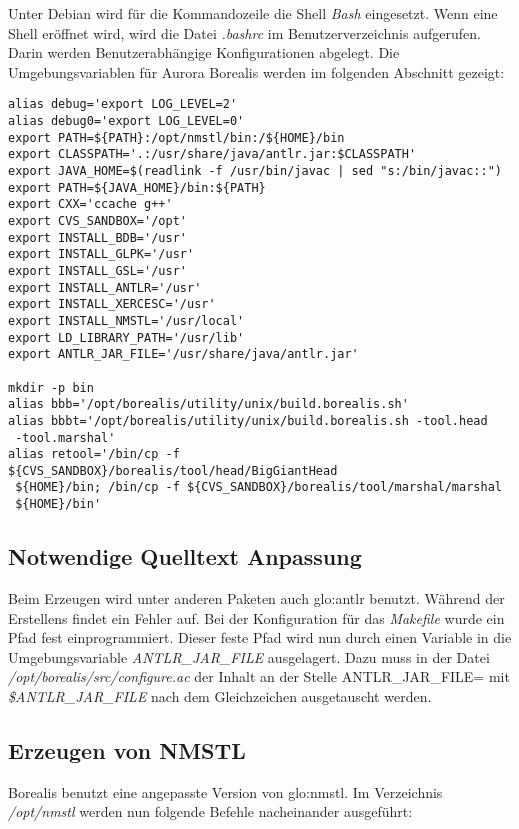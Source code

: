 Unter Debian wird für die Kommandozeile die Shell \textit{Bash} eingesetzt. Wenn eine Shell eröffnet wird, wird die Datei \textit{.bashrc} im Benutzerverzeichnis aufgerufen. Darin werden Benutzerabhängige Konfigurationen abgelegt. Die Umgebungsvariablen für Aurora Borealis werden im folgenden Abschnitt gezeigt:
\begin{verbatim}
alias debug='export LOG_LEVEL=2'
alias debug0='export LOG_LEVEL=0'
export PATH=${PATH}:/opt/nmstl/bin:/${HOME}/bin
export CLASSPATH='.:/usr/share/java/antlr.jar:$CLASSPATH'
export JAVA_HOME=$(readlink -f /usr/bin/javac | sed "s:/bin/javac::")
export PATH=${JAVA_HOME}/bin:${PATH}
export CXX='ccache g++'
export CVS_SANDBOX='/opt'
export INSTALL_BDB='/usr'
export INSTALL_GLPK='/usr'
export INSTALL_GSL='/usr'
export INSTALL_ANTLR='/usr'
export INSTALL_XERCESC='/usr'
export INSTALL_NMSTL='/usr/local'
export LD_LIBRARY_PATH='/usr/lib'
export ANTLR_JAR_FILE='/usr/share/java/antlr.jar'

mkdir -p bin
alias bbb='/opt/borealis/utility/unix/build.borealis.sh'
alias bbbt='/opt/borealis/utility/unix/build.borealis.sh -tool.head
 -tool.marshal'
alias retool='/bin/cp -f ${CVS_SANDBOX}/borealis/tool/head/BigGiantHead
 ${HOME}/bin; /bin/cp -f ${CVS_SANDBOX}/borealis/tool/marshal/marshal
 ${HOME}/bin'
\end{verbatim}


\subsection{Notwendige Quelltext Anpassung}

Beim Erzeugen wird unter anderen Paketen auch \gls{glo:antlr} benutzt. Während der Erstellens findet ein Fehler auf. Bei der Konfiguration für das \textit{Makefile} wurde ein Pfad fest einprogrammiert. Dieser feste Pfad wird nun durch einen Variable in die Umgebungsvariable \textit{ANTLR\_JAR\_FILE} ausgelagert. Dazu muss in der Datei \textit{/opt/borealis/src/configure.ac} der Inhalt an der Stelle ANTLR\_JAR\_FILE= mit \textit{\$ANTLR\_JAR\_FILE} nach dem Gleichzeichen ausgetauscht werden.


\subsection{Erzeugen von NMSTL}

Borealis benutzt eine angepasste Version von \gls{glo:nmstl}. Im Verzeichnis \textit{/opt/nmstl} werden nun folgende Befehle nacheinander ausgeführt:


